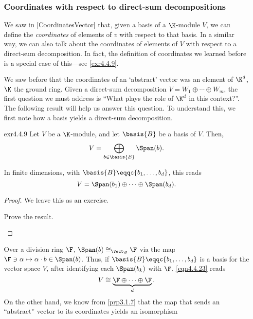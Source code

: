 \subsubsection{Coordinates with respect to direct-sum decompositions}

We saw in \cref{CoordinatesVector} that, given a basis of a $\K$-module $V$, we can define the \emph{coordinates} of elements of $v$ with respect to that basis.  In a similar way, we can also talk about the coordinates of elements of $V$ with respect to a direct-sum decomposition.   In fact, the definition of coordinates we learned before is a special case of this---see \cref{exr4.4.9}.

We saw before that the coordinates of an `abstract' vector was an element of $\K ^d$, $\K$ the ground ring.  Given a direct-sum decomposition $V=W_1\oplus \cdots \oplus W_m$, the first question we must address is ``What plays the role of $\K ^d$ in this context?''.  The following result will help us answer this question. To understand this, we first note how a basis yields a direct-sum decomposition.
\begin{prp}{}{exr4.4.9}
	Let $V$ be a $\K$-module, and let $\basis{B}$ be a basis of $V$.  Then,
	\begin{equation}
	V=\bigoplus _{b\in \basis{B}}\Span (b).
	\end{equation}
	\begin{rmk}
		In finite dimensions, with $\basis{B}\eqqc \{ b_1,\ldots ,b_d\}$, this reads
		\begin{equation}\label{eqn4.4.23}
			V=\Span (b_1)\oplus \cdots \oplus \Span (b_d).
		\end{equation}
	\end{rmk}
	\begin{proof}
		We leave this as an exercise.
		\begin{exr}[breakable=false]{}{}
			Prove the result.
		\end{exr}
	\end{proof}
\end{prp}
Over a division ring $\F$, $\Span (b)\cong _{\Vect _{\F}}\F$ via the map $\F \ni \alpha \mapsto \alpha \cdot b\in \Span (b)$.  Thus, if $\basis{B}\eqqc \{ b_1,\ldots ,b_d\}$ is a basis for the vector space $V$, after identifying each $\Span (b_k)$ with $\F$, \eqref{eqn4.4.23} reads
\begin{equation}
	V\cong \underbrace{\F \oplus \cdots \oplus \F}_d.
\end{equation}
On the other hand, we know from \cref{prp3.1.7} that the map that sends an ``abstract'' vector to its coordinates yields an isomorphism

